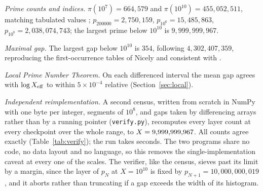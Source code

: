 \documentclass[11pt,a4paper]{article}
\begin{document}
\emph{Prime counts and indices.} $\pi(10^{7})=664{,}579$ and $\pi(10^{10})=455{,}052{,}511$, matching tabulated values \cite{DelegliseRivat1996,CrandallPomerance2005}; $p_{200000}=2{,}750{,}159$, $p_{10^{6}}=15{,}485{,}863$, $p_{10^{8}}=2{,}038{,}074{,}743$; the largest prime below $10^{10}$ is $9{,}999{,}999{,}967$.

\emph{Maximal gap.} The largest gap below $10^{10}$ is $354$, following $4{,}302{,}407{,}359$, reproducing the first-occurrence tables of Nicely \cite{Nicely1999} and consistent with \cite{OliveiraeSilvaHerzogPardi2014}.

\emph{Local Prime Number Theorem.} On each differenced interval the mean gap agrees with $\log X_{\mathrm{eff}}$ to within $5\times10^{-4}$ relative (Section~\ref{sec:local}).

\emph{Independent reimplementation.} A second census, written from scratch in NumPy with one byte per integer, segments of $10^{8}$, and gaps taken by differencing arrays rather than by a running pointer (\texttt{verify.py}), recomputes every layer count at every checkpoint over the whole range, to $X=9{,}999{,}999{,}967$. All \verifyLayers{} counts agree exactly (Table~\ref{tab:verify}); the run takes \verifySeconds{} seconds. The two programs share no code, no data layout and no language, so this removes the single-implementation caveat at every one of the \nScales{} scales. The verifier, like the census, sieves past its limit by a margin, since the layer of $p_N$ at $X=10^{10}$ is fixed by $p_{N+1}=10{,}000{,}000{,}019$, and it aborts rather than truncating if a gap exceeds the width of its histogram.

\begin{table}[tbp]
\centering
\caption{Independent NumPy census against the C census: layer counts compared at each checkpoint with $X\le\verifyXmax$.}
\label{tab:verify}
{\small}
\end{table}
\end{document}
